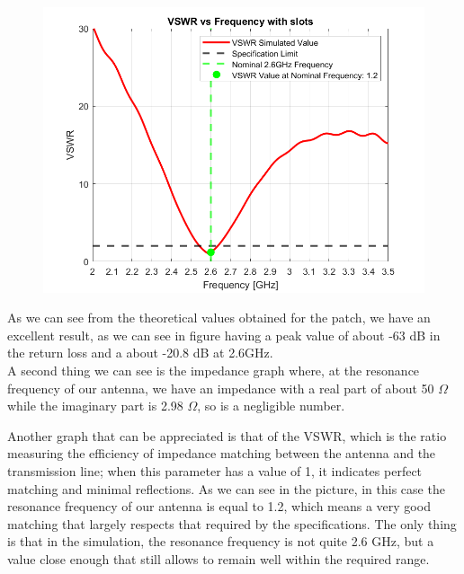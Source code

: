 \documentclass[]{article}
\begin{document}
\begin{figure}[h]
\begin{minipage}{0.48\linewidth}
		\caption{}
		\label{fig:zvsfreqwslotssmall}
	\end{minipage}
	\\[1em] %
	\begin{minipage}{0.48\linewidth}
		\centering
		\includegraphics[width=\linewidth]{img/VSWR_with_slot_small}
		\caption{}
		\label{fig:vswrwithslotsmall}
	\end{minipage}
\end{figure}

As we can see from the theoretical values obtained for the patch, we have an excellent result, as we can see in figure  having a peak value of about -63 dB in the return loss and a about -20.8 dB at 2.6GHz.\\
A second thing we can see is the impedance graph where, at the resonance frequency of our antenna, we have an impedance with a real part of about 50 $\Omega$ while the imaginary part is 2.98 $\Omega$, so is a negligible number.

Another graph that can be appreciated is that of the VSWR, which is the ratio measuring the efficiency of impedance matching between the antenna and the transmission line; when this parameter has a value of 1, it indicates perfect matching and minimal reflections. As we can see in the picture, in this case the resonance frequency of our antenna is equal to 1.2, which means a very good matching that largely respects that required by the specifications. 
The only thing is that in the simulation, the resonance frequency is not quite 2.6 GHz, but a value close enough that still allows to remain well within the required range.
\end{document}
